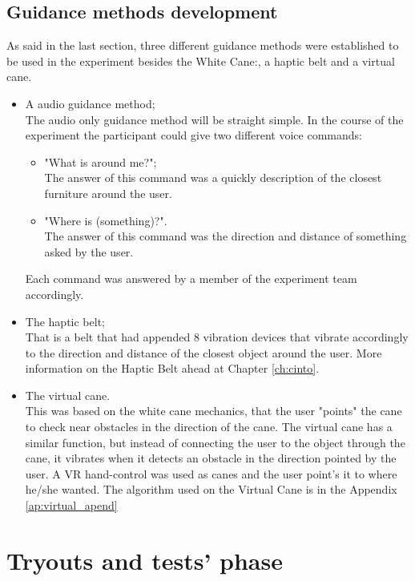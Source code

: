     \subsection{Guidance methods development}
        As said in the last section, three different guidance methods were established to be used in the experiment besides the White Cane:, a haptic belt and a virtual cane.
        \begin{itemize}
            \item A audio guidance method; \\ The audio only guidance method will be straight simple. In the course of the experiment the participant could give two different voice commands:
            \begin{itemize}
                \item  "What is around me?"; \\ The answer of this command was a quickly description of the closest furniture around the user.
                \item  "Where is (something)?". \\ The answer of this command was the direction and distance of something asked by the user.
            \end{itemize}
            Each command was answered by a member of the experiment team accordingly.
            
            \item The haptic belt; \\
            That is a belt that had appended 8 vibration devices that vibrate accordingly to the direction and distance of the closest object around the user. More information on the Haptic Belt ahead at Chapter \ref{ch:cinto}.
            
            \item The virtual cane. \\ 
            This was based on the white cane mechanics, that the user "points" the cane to check near obstacles in the direction of the cane. The virtual cane has a similar function, but instead of connecting the user to the object through the cane, it vibrates when it detects an obstacle in the direction pointed by the user. A VR hand-control was used as canes and the user point's it to where he/she wanted. The algorithm used on the Virtual Cane is in the Appendix \ref{ap:virtual_apend}
        \end{itemize}
    

\section{Tryouts and tests' phase}
\label{sec:tests_phase}
        
